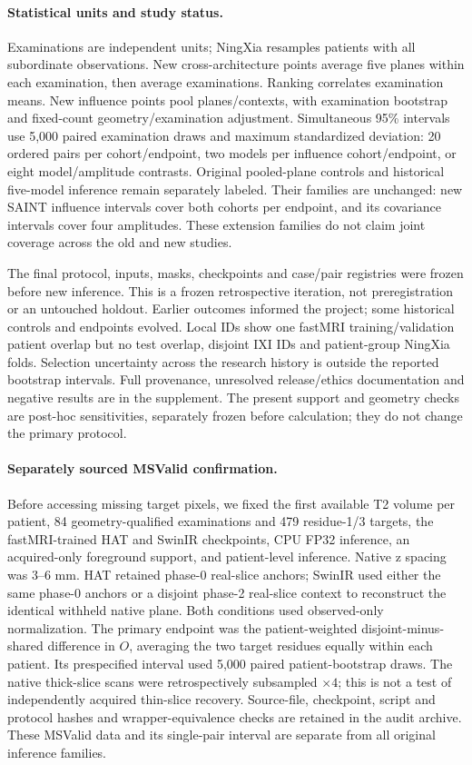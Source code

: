 \documentclass[10pt,twocolumn,letterpaper]{article}
\begin{document}
\paragraph{Statistical units and study status.}
Examinations are independent units; NingXia resamples patients with all subordinate observations. New cross-architecture points average five planes within each examination, then average examinations. Ranking correlates examination means. New influence points pool planes/contexts, with examination bootstrap and fixed-count geometry/examination adjustment. Simultaneous 95\% intervals use 5,000 paired examination draws and maximum standardized deviation: 20 ordered pairs per cohort/endpoint, two models per influence cohort/endpoint, or eight model/amplitude contrasts. Original pooled-plane controls and historical five-model inference remain separately labeled. Their families are unchanged: new SAINT influence intervals cover both cohorts per endpoint, and its covariance intervals cover four amplitudes. These extension families do not claim joint coverage across the old and new studies.

The final protocol, inputs, masks, checkpoints and case/pair registries were frozen before new inference. This is a frozen retrospective iteration, not preregistration or an untouched holdout. Earlier outcomes informed the project; some historical controls and endpoints evolved. Local IDs show one fastMRI training/validation patient overlap but no test overlap, disjoint IXI IDs and patient-group NingXia folds. Selection uncertainty across the research history is outside the reported bootstrap intervals. Full provenance, unresolved release/ethics documentation and negative results are in the supplement. The present support and geometry checks are post-hoc sensitivities, separately frozen before calculation; they do not change the primary protocol.
\paragraph{Separately sourced MSValid confirmation.}
Before accessing missing target pixels, we fixed the first available T2 volume per patient, 84 geometry-qualified examinations and 479 residue-1/3 targets, the fastMRI-trained HAT and SwinIR checkpoints, CPU FP32 inference, an acquired-only foreground support, and patient-level inference. Native z spacing was 3--6 mm. HAT retained phase-0 real-slice anchors; SwinIR used either the same phase-0 anchors or a disjoint phase-2 real-slice context to reconstruct the identical withheld native plane. Both conditions used observed-only normalization. The primary endpoint was the patient-weighted disjoint-minus-shared difference in $O$, averaging the two target residues equally within each patient. Its prespecified interval used 5,000 paired patient-bootstrap draws. The native thick-slice scans were retrospectively subsampled $\times4$; this is not a test of independently acquired thin-slice recovery. Source-file, checkpoint, script and protocol hashes and wrapper-equivalence checks are retained in the audit archive. These MSValid data and its single-pair interval are separate from all original inference families.
\end{document}
